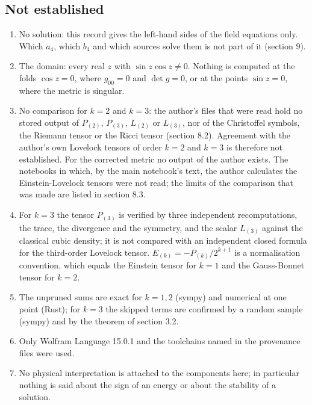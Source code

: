 \documentclass[11pt]{article}
\begin{document}
\subsection{Not established}

\begin{enumerate}
\item No solution: this record gives the left-hand sides of the field equations only. Which $a_4$, which $b_4$ and which sources solve them is not part of it (section 9).
\item The domain: every real $z$ with $\sin z\cos z \neq 0$. Nothing is computed at the folds $\cos z = 0$, where $g_{00} = 0$ and $\det g = 0$, or at the points $\sin z = 0$, where the metric is singular.
\item No comparison for $k = 2$ and $k = 3$: the author's files that were read hold no stored output of $P_{(2)}$, $P_{(3)}$, $L_{(2)}$ or $L_{(3)}$, nor of the Christoffel symbols, the Riemann tensor or the Ricci tensor (section 8.2). Agreement with the author's own Lovelock tensors of order $k = 2$ and $k = 3$ is therefore not established. For the corrected metric no output of the author exists. The notebooks in which, by the main notebook's text, the author calculates the Einstein-Lovelock tensors were not read; the limits of the comparison that was made are listed in section 8.3.
\item For $k = 3$ the tensor $P_{(3)}$ is verified by three independent recomputations, the trace, the divergence and the symmetry, and the scalar $L_{(3)}$ against the classical cubic density; it is not compared with an independent closed formula for the third-order Lovelock tensor. $E_{(k)} = -P_{(k)}/2^{k+1}$ is a normalisation convention, which equals the Einstein tensor for $k = 1$ and the Gauss-Bonnet tensor for $k = 2$.
\item The unpruned sums are exact for $k = 1, 2$ (sympy) and numerical at one point (Rust); for $k = 3$ the skipped terms are confirmed by a random sample (sympy) and by the theorem of section 3.2.
\item Only Wolfram Language 15.0.1 and the toolchains named in the provenance files were used.
\item No physical interpretation is attached to the components here; in particular nothing is said about the sign of an energy or about the stability of a solution.
\end{enumerate}
\end{document}
